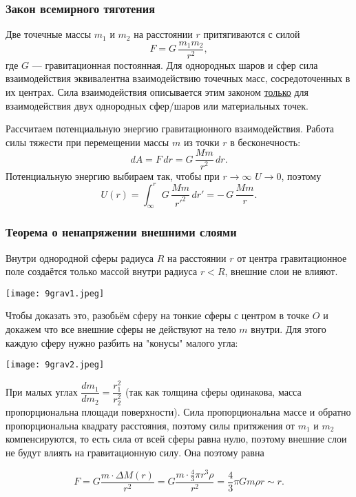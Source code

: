 \documentclass[12pt, a4paper]{article}%
\begin{document}
\subsubsection*{Закон всемирного тяготения}
Две точечные массы $m_1$ и $m_2$ на расстоянии $r$ притягиваются с силой
\[
F = G\,\frac{m_1m_2}{r^2},
\]
где $G$ — гравитационная постоянная. Для однородных шаров и сфер сила взаимодействия эквивалентна взаимодействию точечных масс, сосредоточенных в их центрах. Сила взаимодействия описывается этим законом \underline{только} 
для взаимодействия двух однородных сфер/шаров или материальных точек.

Рассчитаем потенциальную энергию гравитационного взаимодействия. Работа силы тяжести при перемещении массы $m$ из точки $r$ в бесконечность:
\[
dA = F\,dr = G\,\frac{Mm}{r^2}\,dr.
\]
Потенциальную энергию выбираем так, чтобы при $r\to\infty$ $U\to0$, поэтому
\[
U(r) = \int_{\infty}^{r} G\,\frac{Mm}{r'^2}\,dr' = -\,G\,\frac{Mm}{r}.
\]
\subsubsection*{Теорема о ненапряжении внешними слоями}
Внутри однородной сферы радиуса $R$ на расстоянии $r$ от центра гравитационное поле создаётся только массой
внутри радиуса $r < R$, внешние слои не влияют. 

\begin{center}
\texttt{[image: 9grav1.jpeg]}
\label{fig:mpr}
\end{center}

Чтобы доказать это, разобьём сферу на тонкие сферы с центром в точке $O$ и докажем что все внешние сферы не действуют на тело $m$ внутри. Для этого каждую сферу нужно разбить на "конусы" малого угла:

\begin{center}
\texttt{[image: 9grav2.jpeg]}
\label{fig:mpr}
\end{center}

При малых углах $\dfrac{dm_1}{dm_2} = \dfrac{r_1^2}{r_2^2}$ (так как толщина сферы одинакова, масса пропорциональна площади поверхности). Сила пропорциональна массе и обратно пропорциональна квадрату расстояния, поэтому силы притяжения от $m_1$ и $m_2$ компенсируются, то есть сила от всей сферы равна нулю, поэтому внешние слои не будут влиять на гравитационную силу. Она поэтому равна

\[
F = G\frac{m\cdot\Delta M(r)}{r^2} = G\frac{m\cdot\frac43 \pi r^3\rho}{r^2} = \frac43\pi Gm\rho r \sim r.
\]
 
\end{document}
